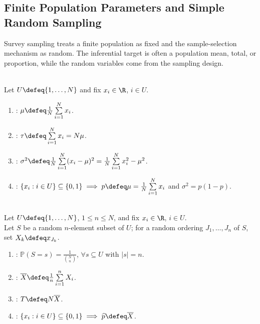 \subsection{Finite Population Parameters and Simple Random Sampling}

Survey sampling treats a finite population as fixed and the sample-selection mechanism as random.  The inferential target is often a population mean, total, or proportion, while the random variables come from the sampling design.

\begin{definition} \label{def:finite-population-parameters} \\
Let $U\defeq\{1,\ldots,N\}$ and fix $x_i\in\R$, $i\in U$.
\begin{enumerate}[label=(\roman*)]
\setlength{\itemsep}{0pt}
\item {}: $\mu\defeq \frac{1}{N}\sum\limits_{i=1}^{N}x_i$.
\item {}: $\tau\defeq\sum\limits_{i=1}^{N}x_i=N\mu$.
\item {}: $\sigma^2\defeq \frac{1}{N}\sum\limits_{i=1}^{N}(x_i-\mu)^2=\frac{1}{N}\sum\limits_{i=1}^{N}x_i^2-\mu^2$.
\item {}: $\{x_i:i\in U\}\subseteq\{0,1\}\implies p\defeq\mu=\frac{1}{N}\sum\limits_{i=1}^{N}x_i$ and $\sigma^2=p(1-p)$.
\end{enumerate}
\end{definition}

\begin{definition} \label{def:simple-random-sampling-without-replacement} \\
Let $U\defeq\{1,\ldots,N\}$, $1\leq n\leq N$, and fix $x_i\in\R$, $i\in U$.\\
Let $S$ be a random $n$-element subset of $U$; for a random ordering $J_1,\ldots,J_n$ of $S$, set $X_k\defeq x_{J_k}$.
\begin{enumerate}[label=(\roman*)]
\setlength{\itemsep}{0pt}
\item {}: $\mathbb{P}(S=s)=\frac{1}{\binom{N}{n}}$, $\forall s\subseteq U$ with $|s|=n$.
\item {}: $\overline{X}\defeq \frac{1}{n}\sum\limits_{i=1}^{n}X_i$.
\item {}: $T\defeq N\overline{X}$.
\item {}: $\{x_i:i\in U\}\subseteq\{0,1\}\implies \widehat p\defeq\overline{X}$.
\end{enumerate}
\end{definition}

